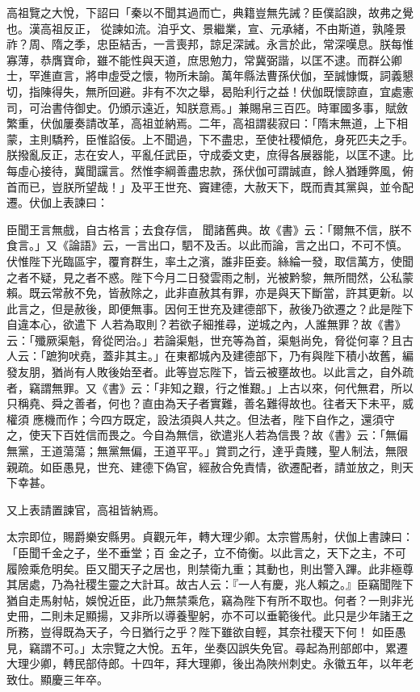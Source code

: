 \begin{pinyinscope}
 高祖覽之大悅，下詔曰「秦以不聞其過而亡，典籍豈無先誡？臣僕諂諛，故弗之覺也。漢高祖反正，
 從諫如流。洎乎文、景繼業，宣、元承緒，不由斯道，孰隆景祚？周、隋之季，忠臣結舌，一言喪邦，諒足深誡。永言於此，常深嘆息。朕每惟寡薄，恭膺寶命，雖不能性與天道，庶思勉力，常冀弼諧，以匡不逮。而群公卿士，罕進直言，將申虛受之懷，物所未諭。萬年縣法曹孫伏伽，至誠慷慨，詞義懇切，指陳得失，無所回避。非有不次之舉，曷貽利行之益！伏伽既懷諒直，宜處憲司，可治書侍御史。仍頒示遠近，知朕意焉。」兼賜帛三百匹。時軍國多事，賦斂
 繁重，伏伽屢奏請改革，高祖並納焉。二年，高祖謂裴寂曰：「隋末無道，上下相蒙，主則驕矜，臣惟諂佞。上不聞過，下不盡忠，至使社稷傾危，身死匹夫之手。朕撥亂反正，志在安人，平亂任武臣，守成委文吏，庶得各展器能，以匡不逮。比每虛心接待，冀聞讜言。然惟李綱善盡忠款，孫伏伽可謂誠直，餘人猶踵弊風，俯首而已，豈朕所望哉！」及平王世充、竇建德，大赦天下，既而責其黨與，並令配遷。伏伽上表諫曰：



 臣聞王言無戲，自古格言；去食存信，
 聞諸舊典。故《書》云：「爾無不信，朕不食言。」又《論語》云，一言出口，駟不及舌。以此而論，言之出口，不可不慎。伏惟陛下光臨區宇，覆育群生，率土之濱，誰非臣妾。絲綸一發，取信萬方，使聞之者不疑，見之者不惑。陛下今月二日發雲雨之制，光被黔黎，無所間然，公私蒙賴。既云常赦不免，皆赦除之，此非直赦其有罪，亦是與天下斷當，許其更新。以此言之，但是赦後，即便無事。因何王世充及建德部下，赦後乃欲遷之？此是陛下自違本心，欲遣下
 人若為取則？若欲子細推尋，逆城之內，人誰無罪？故《書》云：「殲厥渠魁，脅從罔治。」若論渠魁，世充等為首，渠魁尚免，脅從何辜？且古人云：「蹠狗吠堯，蓋非其主。」在東都城內及建德部下，乃有與陛下積小故舊，編發友朋，猶尚有人敗後始至者。此等豈忘陛下，皆云被壅故也。以此言之，自外疏者，竊謂無罪。又《書》云：「非知之艱，行之惟艱。」上古以來，何代無君，所以只稱堯、舜之善者，何也？直由為天子者實難，善名難得故也。往者天下未平，威權須
 應機而作；今四方既定，設法須與人共之。但法者，陛下自作之，還須守之，使天下百姓信而畏之。今自為無信，欲遣兆人若為信畏？故《書》云：「無偏無黨，王道蕩蕩；無黨無偏，王道平平。」賞罰之行，達乎貴賤，聖人制法，無限親疏。如臣愚見，世充、建德下偽官，經赦合免責情，欲遷配者，請並放之，則天下幸甚。



 又上表請置諫官，高祖皆納焉。



 太宗即位，賜爵樂安縣男。貞觀元年，轉大理少卿。太宗嘗馬射，伏伽上書諫曰：「臣聞千金之子，坐不垂堂；百
 金之子，立不倚衡。以此言之，天下之主，不可履險乘危明矣。臣又聞天子之居也，則禁衛九重；其動也，則出警入蹕。此非極尊其居處，乃為社稷生靈之大計耳。故古人云：『一人有慶，兆人賴之。』臣竊聞陛下猶自走馬射帖，娛悅近臣，此乃無禁乘危，竊為陛下有所不取也。何者？一則非光史冊，二則未足顯揚，又非所以導養聖躬，亦不可以垂範後代。此只是少年諸王之所務，豈得既為天子，今日猶行之乎？陛下雖欲自輕，其奈社稷天下何！
 如臣愚見，竊謂不可。」太宗覽之大悅。五年，坐奏囚誤失免官。尋起為刑部郎中，累遷大理少卿，轉民部侍郎。十四年，拜大理卿，後出為陜州刺史。永徽五年，以年老致仕。顯慶三年卒。




\end{pinyinscope}
